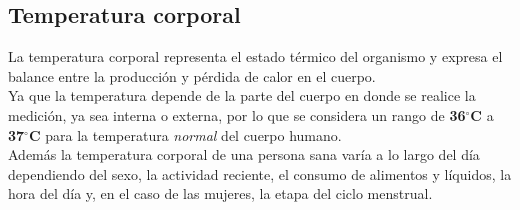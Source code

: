 %	
%	
%	
	
	\subsection{Temperatura corporal}
	La temperatura corporal representa el estado térmico del organismo y expresa el balance entre la producción y pérdida de calor en el cuerpo. \cite{cobo2011} \\
	
	Ya que la temperatura depende de la parte del cuerpo en donde se realice la medición, ya sea interna o externa, por lo que se considera un rango de \textbf{36$^{\circ}$C} a \textbf{37$^{\circ}$C} para la temperatura \textit{normal} del cuerpo humano. \\
	
	Además la temperatura corporal de una persona sana varía a lo largo del día dependiendo del sexo, la actividad reciente, el consumo de alimentos y líquidos, la hora del día y, en el caso de las mujeres, la etapa del ciclo menstrual.  \cite{signosvitales2016} \\
	

